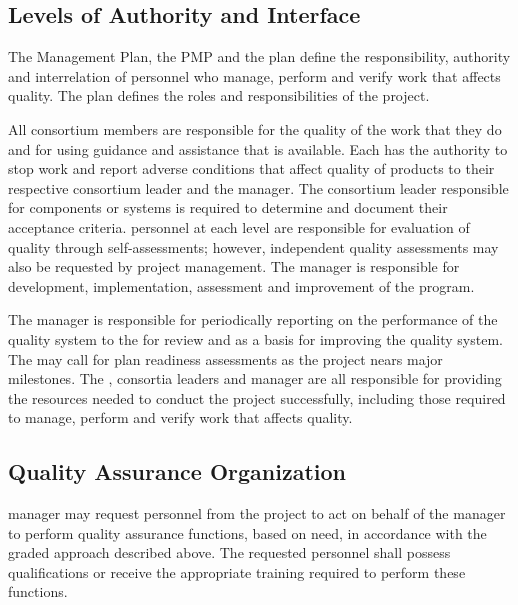 \subsection{Levels of Authority and Interface}

The  Management Plan, the  PMP
and the   plan define the
responsibility, authority and interrelation of personnel who manage,
perform and verify work that affects quality. The  plan
defines the  roles and responsibilities of the 
project.

All consortium members are responsible for the quality of the work that
they do and for using guidance and assistance that is available. Each
has the authority to stop work and report adverse conditions that
affect quality of  products to their respective
 consortium leader and the 
 manager. The consortium leader responsible for 
components or systems is required to determine and document their
acceptance criteria.  personnel at each level are
responsible for evaluation of quality through self-assessments;
however, independent quality assessments may also be requested by
project management.  The   manager is
responsible for development, implementation, assessment and
improvement of the  program.

The   manager is responsible for
periodically reporting on the performance of the quality system to the
  for review and as a basis for improving
the quality system. The   may call for
 plan readiness assessments as the project nears major
milestones. The  , consortia leaders and
  manager are all responsible for
providing the resources needed to conduct the project successfully,
including those required to manage, perform and verify work that
affects quality.

\subsection{Quality Assurance Organization}

  manager may request personnel
from the  project to act on behalf of the
  manager to perform quality
assurance functions, based on need, in accordance with the graded
approach described above. The requested personnel shall possess
qualifications or receive the appropriate training required to perform
these functions.

